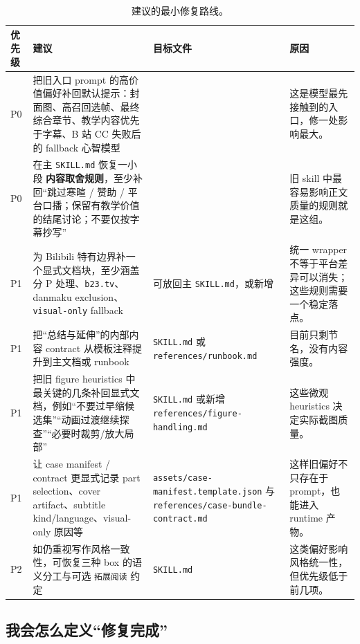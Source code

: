 \documentclass[a4paper]{article}
\begin{document}
\begin{table}[H]
\centering
\small
\begin{tabularx}{\textwidth}{p{1.1cm}p{4.8cm}p{4.3cm}Y}
\toprule
\textbf{优先级} & \textbf{建议} & \textbf{目标文件} & \textbf{原因} \\
\midrule
P0 & 把旧入口 prompt 的高价值偏好补回默认提示：封面图、高召回选帧、最终综合章节、教学内容优先于字幕、B 站 CC 失败后的 fallback 心智模型 &  & 这是模型最先接触到的入口，修一处影响最大。 \\
P0 & 在主 \texttt{SKILL.md} 恢复一小段 \textbf{内容取舍规则}，至少补回“跳过寒暄 / 赞助 / 平台口播；保留有教学价值的结尾讨论；不要仅按字幕抄写” &  & 旧 skill 中最容易影响正文质量的规则就是这组。 \\
P1 & 为 Bilibili 特有边界补一个显式文档块，至少涵盖分 P 处理、\texttt{b23.tv}、danmaku exclusion、\texttt{visual-only} fallback & 可放回主 \texttt{SKILL.md}，或新增  & 统一 wrapper 不等于平台差异可以消失；这些规则需要一个稳定落点。 \\
P1 & 把“总结与延伸”的内部内容 contract 从模板注释提升到主文档或 runbook & \texttt{SKILL.md} 或 \texttt{references/runbook.md} & 目前只剩节名，没有内容强度。 \\
P1 & 把旧 figure heuristics 中最关键的几条补回显式文档，例如“不要过早缩候选集”“动画过渡继续探查”“必要时裁剪/放大局部” & \texttt{SKILL.md} 或新增 \texttt{references/figure-handling.md} & 这些微观 heuristics 决定实际截图质量。 \\
P1 & 让 case manifest / contract 更显式记录 part selection、cover artifact、subtitle kind/language、visual-only 原因等 & \texttt{assets/case-manifest.template.json} 与 \texttt{references/case-bundle-contract.md} & 这样旧偏好不只存在于 prompt，也能进入 runtime 产物。 \\
P2 & 如仍重视写作风格一致性，可恢复三种 box 的语义分工与可选 \texttt{拓展阅读} 约定 & \texttt{SKILL.md} & 这类偏好影响风格统一性，但优先级低于前几项。 \\
\bottomrule
\end{tabularx}
\caption{建议的最小修复路线。}
\end{table}

\subsection{我会怎么定义“修复完成”}
\end{document}
